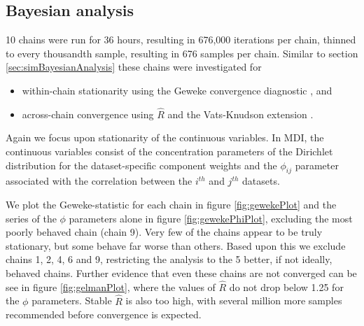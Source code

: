 \documentclass[]{article}
\begin{document}
\subsection{Bayesian analysis} \label{sec:yeastBayesianAnalysis}
10 chains were run for 36 hours, resulting in 676,000 iterations per chain, thinned to every thousandth sample, resulting in 676 samples per chain. 
Similar to section \ref{sec:simBayesianAnalysis} these chains were investigated for 
\begin{itemize}
	\item within-chain stationarity using the Geweke convergence diagnostic \citep{geweke1991evaluating}, and
	\item across-chain convergence using $\hat{R}$ \citep{gelman1992inference} and the Vats-Knudson extension \citep[\emph{stable $\hat{R}$},][]{vats2018revisiting}.
\end{itemize}
%
%
Again we focus upon stationarity of the continuous variables. In MDI, the continuous variables consist of the concentration parameters of the Dirichlet distribution for the dataset-specific component weights and the $\phi_{ij}$ parameter associated with the correlation between the $i^{th}$ and $j^{th}$ datasets. 

We plot the Geweke-statistic for each chain in figure \ref{fig:gewekePlot} and the series of the $\phi$ parameters alone in figure \ref{fig:gewekePhiPlot}, excluding the most poorly behaved chain (chain 9). Very few of the chains appear to be truly stationary, but some behave far worse than others. Based upon this we exclude chains 1, 2, 4, 6 and 9, restricting the analysis to the 5 better, if not ideally, behaved chains. Further evidence that even these chains are not converged can be see in figure \ref{fig:gelmanPlot}, where the values of $\hat{R}$ do not drop below 1.25 for the $\phi$ parameters. Stable $\hat{R}$ is also too high, with several million more samples recommended before convergence is expected.
\end{document}
